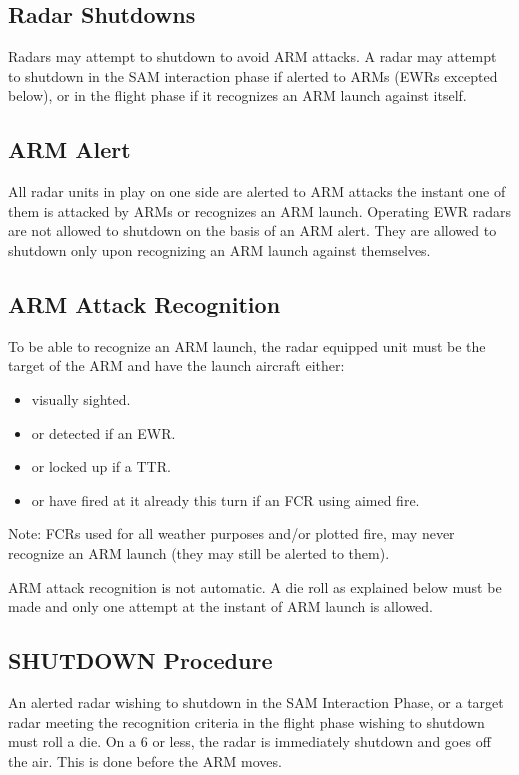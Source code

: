 \subsection{Radar Shutdowns} Radars may attempt to shutdown to avoid ARM attacks. A radar may attempt to shutdown in the SAM interaction phase if alerted to ARMs (EWRs excepted below), or in the flight phase if it recognizes an ARM launch against itself.

\subsection{ARM Alert} All radar units in play on one side are alerted to ARM attacks the instant one of them is attacked by ARMs or recognizes an ARM launch. Operating EWR radars are not allowed to shutdown on the basis of an ARM alert. They are allowed to shutdown only upon recognizing an ARM launch against themselves.

\subsection{ARM Attack Recognition} To be able to recognize an ARM launch, the radar equipped unit must be the target of the ARM and have the launch aircraft either:

\begin{itemize}
\item visually sighted.

\item or detected if an EWR.

\item or locked up if a TTR.

\item or have fired at it already this turn if an FCR using aimed fire.
\end{itemize}

Note: FCRs used for all weather purposes and/or plotted fire, may never recognize an ARM launch (they may still be alerted to them).

ARM attack recognition is not automatic. A die roll as explained below must be made and only one attempt at the instant of ARM launch is allowed.

\subsection{SHUTDOWN Procedure} An alerted radar wishing to shutdown in the SAM Interaction Phase, or a target radar meeting the recognition criteria in the flight phase wishing to shutdown must roll a die. On a 6 or less, the radar is immediately shutdown and goes off the air. This is done before the ARM moves. 

